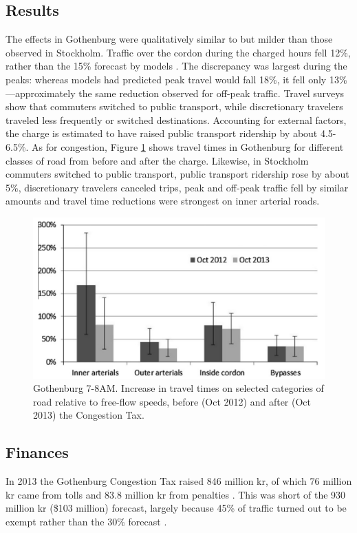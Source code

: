 \subsection{Results}

The effects in Gothenburg were qualitatively similar to but milder than those observed in Stockholm. Traffic over the cordon during the charged hours fell 12\%, rather than the 15\% forecast by models \citep{Borjesson2015}. The discrepancy was largest during the peaks: whereas models had predicted peak travel would fall 18\%, it fell only 13\%---approximately the same reduction observed for off-peak traffic. Travel surveys show that commuters switched to public transport, while discretionary travelers traveled less frequently or switched destinations. Accounting for external factors, the charge is estimated to have raised public transport ridership by about 4.5-6.5\%. As for congestion, Figure \ref{fig:Gothenburg-travel-times} shows travel times in Gothenburg for different classes of road from before and after the charge. Likewise, in Stockholm commuters switched to public transport, public transport ridership rose by about 5\%, discretionary travelers canceled trips, peak and off-peak traffic fell by similar amounts and travel time reductions were strongest on inner arterial roads.

\begin{figure}[ht]
\includegraphics[width=0.55\columnwidth]{../img/gburg-travel-times.png}

\caption{Gothenburg 7-8AM. Increase in travel times on selected categories of road relative to free-flow speeds, before (Oct 2012) and after (Oct 2013) the Congestion Tax. \citep{Borjesson2015} \label{fig:Gothenburg-travel-times}}

\end{figure}

\subsection{Finances}

In 2013 the Gothenburg Congestion Tax raised 846 million kr, of which 76 million kr came from tolls and 83.8 million kr from penalties \citep{TransportstyrelsenGburg2013}. This was short of the 930 million kr (\$103 million) forecast, largely because 45\% of traffic turned out to be exempt rather than the 30\% forecast \citep{Borjesson2015}.

